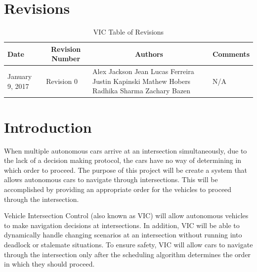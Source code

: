 \documentclass [10pt]{article}
\begin{document}
\section{Revisions}
\begin{longtable}{| p{ } | p{ } | p{ } | p{ } |} \caption{VIC Table of Revisions}  \\

\hline 
\centering \textbf{Date} & 
\multicolumn{1}{c}{\textbf {Revision Number}} &
\multicolumn{1}{|c}{\textbf {Authors}} & 
\multicolumn{1}{|c|}{\textbf {Comments}} \\ \hline

\multirow{4}{*}{\centering January 9, 2017}  & 
\multirow{4}{*}{Revision 0}& 
{Alex Jackson \newline
Jean Lucas Ferreira \newline
Justin Kapinski\newline
Mathew Hobers\newline
Radhika Sharma\newline
Zachary Bazen}
&
 \multirow{4}{*}{N/A} \\ 
\hline 


\end{longtable}
\pagebreak


\section {Introduction}


When multiple autonomous cars arrive at an intersection simultaneously, due to the lack of a decision making protocol, the cars have no way of determining in which order to proceed. The purpose of this project will be create a system that allows autonomous cars to navigate through  intersections. This will be accomplished by providing an appropriate order for the vehicles to proceed through the intersection.  \newline


Vehicle Intersection Control (also known as VIC) will allow autonomous vehicles to make navigation decisions at intersections. In addition, VIC will be able to dynamically handle changing scenarios at an intersection without running into deadlock or stalemate situations. To ensure safety, VIC will allow cars to navigate through the intersection only after the scheduling algorithm determines the order in which they should proceed. \newline
\end{document}
